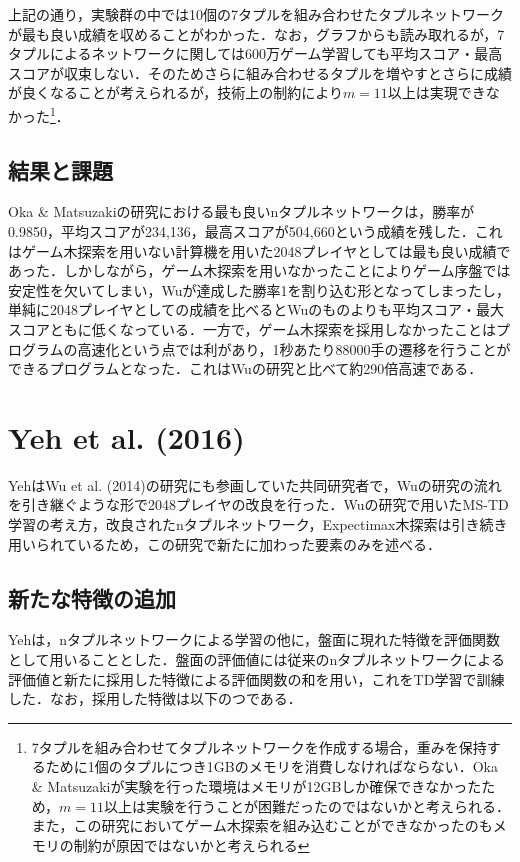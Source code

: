 \documentclass{suribt}
\begin{document}
上記の通り，実験群の中では10個の7タプルを組み合わせたタプルネットワークが最も良い成績を収めることがわかった．なお，グラフからも読み取れるが，7タプルによるネットワークに関しては600万ゲーム学習しても平均スコア・最高スコアが収束しない．そのためさらに組み合わせるタプルを増やすとさらに成績が良くなることが考えられるが，技術上の制約により$m=11$以上は実現できなかった\footnote{7タプルを組み合わせてタプルネットワークを作成する場合，重みを保持するために1個のタプルにつき1GBのメモリを消費しなければならない．Oka \& Matsuzakiが実験を行った環境はメモリが12GBしか確保できなかったため，$m=11$以上は実験を行うことが困難だったのではないかと考えられる．また，この研究においてゲーム木探索を組み込むことができなかったのもメモリの制約が原因ではないかと考えられる}．

\subsection{結果と課題}
Oka \& Matsuzakiの研究における最も良いnタプルネットワークは，勝率が0.9850，平均スコアが234,136，最高スコアが504,660という成績を残した．これはゲーム木探索を用いない計算機を用いた2048プレイヤとしては最も良い成績であった．しかしながら，ゲーム木探索を用いなかったことによりゲーム序盤では安定性を欠いてしまい，Wuが達成した勝率1を割り込む形となってしまったし，単純に2048プレイヤとしての成績を比べるとWuのものよりも平均スコア・最大スコアともに低くなっている．一方で，ゲーム木探索を採用しなかったことはプログラムの高速化という点では利があり，1秒あたり88000手の遷移を行うことができるプログラムとなった．これはWuの研究と比べて約290倍高速である．

\section{Yeh et al. (2016)}
YehはWu et al. (2014)の研究にも参画していた共同研究者で，Wuの研究の流れを引き継ぐような形で2048プレイヤの改良を行った．Wuの研究で用いたMS-TD学習の考え方，改良されたnタプルネットワーク，Expectimax木探索は引き続き用いられているため，この研究で新たに加わった要素のみを述べる．

\subsection{新たな特徴の追加}
Yehは，nタプルネットワークによる学習の他に，盤面に現れた特徴を評価関数として用いることとした．盤面の評価値には従来のnタプルネットワークによる評価値と新たに採用した特徴による評価関数の和を用い，これをTD学習で訓練した．なお，採用した特徴は以下のつである．
\end{document}
